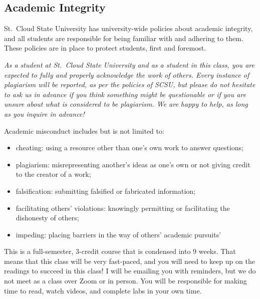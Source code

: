 \documentclass{tufte-handout}
\begin{document}
\begin{fullwidth}
\section{Academic Integrity}



{St.\ Cloud State University has university-wide policies about academic integrity, and all students are responsible for being familiar with and adhering to them. These policies are in place to protect students, first and foremost. }



\emph{As a student at St.\ Cloud State University and as a student in this class, you are expected to fully and properly acknowledge the work of others. Every instance of plagiarism will be reported, as per the policies of SCSU, but please do not hesitate to ask us in advance if you think something might be questionable or if you are unsure about what is considered to be plagiarism. We are happy to help, as long as you inquire in advance! }

Academic misconduct includes but is not limited to:

\begin{itemize}
	\item cheating: using a resource other than one's own work to answer questions;
	\item plagiarism: misrepresenting another's ideas as one's own or not giving credit to the creator of a work;
	\item falsification: submitting falsified or fabricated information;
	\item facilitating others' violations: knowingly permitting or facilitating the dishonesty of others;
	\item impeding: placing barriers in the way of others' academic pursuits'
\end{itemize}



\color{blue}  This is a full-semester, 3-credit course that is condensed into 9 weeks. That means that this class will be very fast-paced, and you will need to keep up on the readings to succeed in this class!  I will be emailing you with reminders, but we do not meet as a class over Zoom or in person. You will be responsible for making time to read, watch videos, and complete labs in your own time.


\end{fullwidth}
\end{document}
